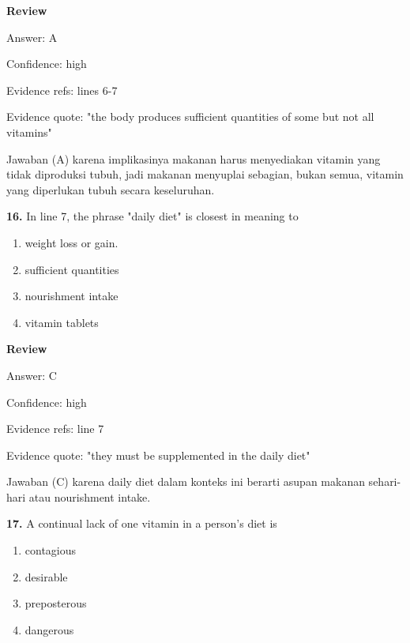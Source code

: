 \documentclass[12pt]{article}
\begin{document}
\par
\begingroup
\setlength{\parskip}{0pt}
\setlength{\parindent}{0pt}
\textbf{Review}\par
Answer: A\par
Confidence: high\par
Evidence refs: lines 6-7\par
Evidence quote: "the body produces sufficient quantities of some but not all vitamins"\par
Jawaban (A) karena implikasinya makanan harus menyediakan vitamin yang tidak diproduksi tubuh, jadi makanan menyuplai sebagian, bukan semua, vitamin yang diperlukan tubuh secara keseluruhan.\par
\endgroup
\par
\vspace{0.25\baselineskip}
\noindent\textbf{16.} In line 7, the phrase "daily diet" is closest in meaning to
\begin{enumerate}[label=(\Alph*),leftmargin=*,itemsep=0.2em]
\item weight loss or gain.
\item sufficient quantities
\item nourishment intake
\item vitamin tablets
\end{enumerate}
\par
\begingroup
\setlength{\parskip}{0pt}
\setlength{\parindent}{0pt}
\textbf{Review}\par
Answer: C\par
Confidence: high\par
Evidence refs: line 7\par
Evidence quote: "they must be supplemented in the daily diet"\par
Jawaban (C) karena daily diet dalam konteks ini berarti asupan makanan sehari-hari atau nourishment intake.\par
\endgroup
\par
\vspace{0.25\baselineskip}
\noindent\textbf{17.} A continual lack of one vitamin in a person's diet is
\begin{enumerate}[label=(\Alph*),leftmargin=*,itemsep=0.2em]
\item contagious
\item desirable
\item preposterous
\item dangerous
\end{enumerate}
\par
\begingroup
\setlength{\parskip}{0pt}
\end{document}
